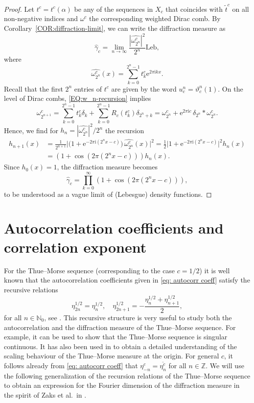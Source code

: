 \documentclass[11pt,reqno]{amsart}
\theoremstyle{plain}
\theoremstyle{definition}
\newcommand{\Z}{{\mathbb Z}}
\newcommand{\N}{{\mathbb N}}
\newcommand{\im}{{\mathrm{i}}}
\newcommand{\me}{\mathrm{e}}
\newcommand{\ts}{\hspace{0.5pt}}
\begin{document}
\begin{proof}
Let $t^c = t^c(\alpha)$ be any of the sequences in $X_c$ that coincides with $\widetilde{t}^c$ on all non-negative indices 
and $\omega^c$ the corresponding weighted Dirac comb. By Corollary~\ref{COR:diffraction-limit}, we can write the diffraction measure as
\[
\widehat{\gamma}_{c} = \lim_{n \to \infty} \frac{|\widehat{\omega_{2^n}^c}|^2}{2^n} \mathrm{Leb},
\]
where
\[
\widehat{\omega_{2^n}^c}(x) 
= \sum_{k = 0}^{2^n-1} t_k^c \me^{2 \pi \im k x}.
\] 
Recall that the first $2^n$ entries of $t^c$ are given by the word $u_c^n = \vartheta_c^n(1)$.
On the level of Dirac combs, \eqref{EQ:w_n-recursion} implies 
\[
\omega_{2^{n+1}}^c = \sum_{k = 0}^{2^n - 1} t_k^{c} \delta_k + \sum_{k = 0}^{2^n - 1} R_c(t_k^{c}) \delta_{2^n + k}  
= \omega_{2^n}^c + \me^{2 \pi \im c} \, \delta_{2^n} \ast \omega_{2^n}^c.
\]
Hence, we find for $h_n = |\widehat{\omega_{2^n}^c}|^2/2^n$ the recursion
\begin{align*}
h_{n+1}(x) &= \frac{1}{2^{n+1}} \Big|\big(1 + \me^{-2 \pi \im (2^n x - c)}\big)\, \widehat{\omega_{2^n}^c}(x)\Big|^2 
= \frac{1}{2} \Big|1 + \me^{-2 \pi \im (2^n x - c)}\Big|^2 h_n(x) 
\\ &=(1 + \cos(2\pi (2^n x - c)) ) h_n(x).
\end{align*}
Since $h_0(x) = 1$, the diffraction measure becomes
\[
\widehat{\gamma}_c = \prod_{k = 0}^{\infty} (1 + \cos(2\pi (2^n x - c))),
\]
to be understood as a vague limit of (Lebesgue) density functions.
\end{proof}



\section{Autocorrelation coefficients and correlation exponent}\label{sec: autocorr coeff}
For the Thue{\ts}--Morse sequence (corresponding to the case $c = 1/2$) it is well known that the autocorrelation coefficients given in \eqref{eq: autocorr coeff} satisfy the recursive relations
\[
\eta_{2n}^{1/2} = \eta_n^{1/2},
\quad \eta_{2n+1}^{1/2} = - \frac{\eta_n^{1/2} + \eta_{n+1}^{1/2}}{2},
\]
for all $n \in \N_0$, see \cite[Ch.~10]{baake}.
This recursive structure is very useful to study both the autocorrelation and the diffraction measure of the Thue{\ts}--Morse sequence. For example, it can be used to show that the Thue{\ts}--Morse sequence is singular continuous. It has also been used in \cite{BG19} to obtain a detailed understanding of the scaling behaviour of the Thue{\ts}--Morse measure at the origin. 
For general $c$, it follows already from 
\eqref{eq: autocorr coeff} that $\eta_{-n}^c = \overline{\eta_n^c}$ for all $n \in \Z$.
We will use the following generalization of the recursion relations of the Thue{\ts}--Morse sequence to obtain an expression for the Fourier dimension of the diffraction measure in the spirit of Zaks et al.\ in \cite{Zaks}.
\end{document}
